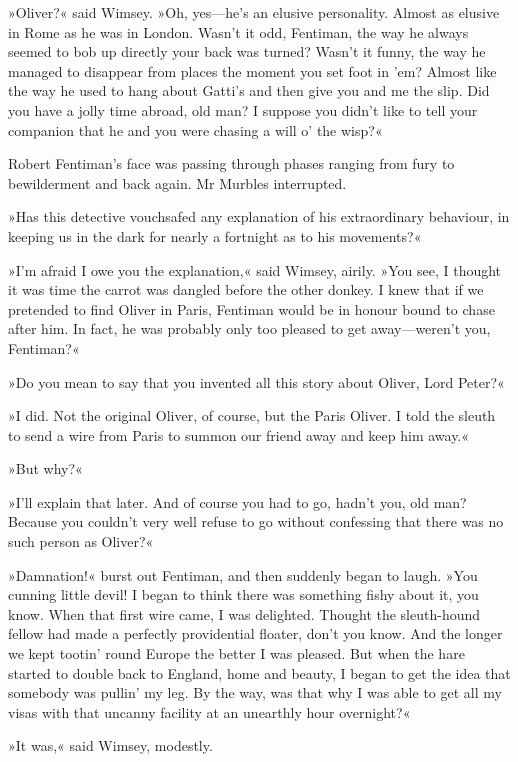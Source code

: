 »Oliver?« said Wimsey. »Oh, yes\allowbreak---\allowbreak he's an elusive personality. Almost as elusive in Rome as he was in London. Wasn't it odd, Fentiman, the way he always seemed to bob up directly your back was turned? Wasn't it funny, the way he managed to disappear from places the moment you set foot in 'em? Almost like the way he used to hang about Gatti's and then give you and me the slip. Did you have a jolly time abroad, old man? I suppose you didn't like to tell your companion that he and you were chasing a will o' the wisp?«

Robert Fentiman's face was passing through phases ranging from fury to bewilderment and back again. Mr Murbles interrupted.

»Has this detective vouchsafed any explanation of his extraordinary behaviour, in keeping us in the dark for nearly a fortnight as to his movements?«

»I'm afraid I owe you the explanation,« said Wimsey, airily. »You see, I thought it was time the carrot was dangled before the other donkey. I knew that if we pretended to find Oliver in Paris, Fentiman would be in honour bound to chase after him. In fact, he was probably only too pleased to get away\allowbreak---\allowbreak weren't you, Fentiman?«

»Do you mean to say that you invented all this story about Oliver, Lord Peter?«

»I did. Not the original Oliver, of course, but the Paris Oliver. I told the sleuth to send a wire from Paris to summon our friend away and keep him away.«

»But why?«

»I'll explain that later. And of course you had to go, hadn't you, old man? Because you couldn't very well refuse to go without confessing that there was no such person as Oliver?«

»Damnation!« burst out Fentiman, and then suddenly began to laugh. »You cunning little devil! I began to think there was something fishy about it, you know. When that first wire came, I was delighted. Thought the sleuth-hound fellow had made a perfectly providential floater, don't you know. And the longer we kept tootin' round Europe the better I was pleased. But when the hare started to double back to England, home and beauty, I began to get the idea that somebody was pullin' my leg. By the way, was that why I was able to get all my visas with that uncanny facility at an unearthly hour overnight?«

»It was,« said Wimsey, modestly.

